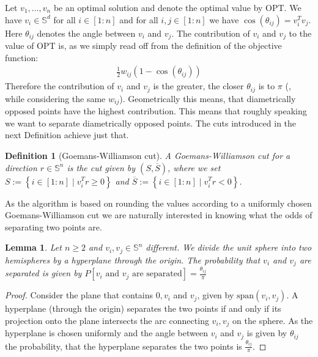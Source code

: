\documentclass[12pt,a4paper]{article}
\theoremstyle{mythm}
\newtheorem{Def}[thm]{Definition}
\newtheorem{lem}[thm]{Lemma}
\begin{document}
Let $ v_1 , \dots , v_n $ be an optimal solution and denote the optimal value by OPT.
We have $ v_i \in \mathbb{S} ^{ d }  $ for all $ i \in \left[ 1:n \right]  $ and 
for all $ i,j \in \left[ 1:n \right]  $ we have $ \cos( \theta _{ ij }  ) = v_i ^T v_j $. 
Here $ \theta _{ ij }  $ denotes the angle between $ v_i $ and $ v_j $.
The contribution of $ v_i $ and $ v_j $ to the value of OPT is, as we simply read off from the definition of the objective function:
\begin{align*}
\frac{ 1 }{ 2 } w _{ ij } \left( 1 - \cos( \theta _{ ij }  )  \right) 
\end{align*} 
Therefore the contribution of $ v_i $ and $ v_j $ is the greater, the closer $ \theta _{ ij }  $ is to $ \pi  $ (, while considering the same $ w _{ ij }  $). 
Geometrically this means, that diametrically opposed points have the highest contribution.
This means that roughly speaking we want to separate diametrically opposed points.
The cuts introduced in the next Definition achieve just that.
\begin{Def}[Goemans-Williamson cut] 
A Goemans-Williamson cut for a direction $ r \in \mathbb{S} ^{ n }  $ is the cut given by 
$ \left( S , \overline{ S }  \right)  $, where we set $ S := \left\{ i \in \left[ 1:n \right]  \mid  v_i ^T r \geq 0  \right\}  $ and 
$ \overline{ S }  := \left\{ i \in \left[ 1:n \right] \mid  v_i ^T r < 0  \right\} $.
\end{Def} 
As the algorithm is based on rounding the values according to a uniformly chosen Goemans-Williamson cut we are naturally interested in knowing what the odds of separating
two points are.
\begin{lem}
\label{lem:angle} 
Let $ n \geq 2  $ and $ v_i , v_j \in \mathbb{S} ^{ n } $ different. We divide the unit sphere into two hemispheres by a hyperplane through the origin.
The probability that $ v_i $ and $ v_j $ are separated is given by $ P \left[ v_i \text{ and } v_j \text{ are separated}  \right] = \frac{ \theta _{ ij }  }{ \pi }   $
\end{lem} 
\begin{proof}
Consider the plane that contains $ 0,v_i $ and $ v_j $, given by $ \text{span} \left( v_i, v_j \right) $.
A hyperplane (through the origin) separates the two points if and only if its projection onto the plane intersects the arc connecting $ v_i, v_j $ on the sphere.
As the hyperplane is chosen uniformly and the angle between $ v_i $ and $ v_j $ is given by $ \theta _{ ij }  $ the probability, that the hyperplane separates the two points is $ \frac{ \theta _{ ij }  }{ \pi }  $.
\end{proof}
\end{document}
